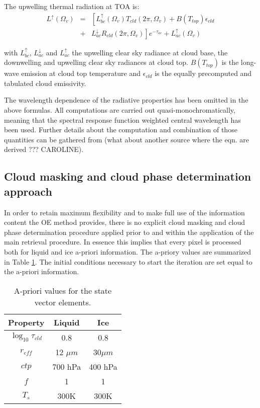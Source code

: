 \documentclass[amt]{style/copernicus}
\begin{document}
The upwelling thermal radiation at TOA is:
\begin{eqnarray}
L^\uparrow(\Omega_v) &=&\left [L^\uparrow_{bc}(\Omega_v)T_{cld}(2\pi,\Omega_v)+B(T_{top})\epsilon_{cld}\right .\\\nonumber
                                      &+& \left . L^\downarrow_{ac}R_{cld}(2\pi,\Omega_v)\right ] e^{-\tau_{ac}}+L_{ac}^\uparrow(\Omega_v)
\end{eqnarray}

with $L^\uparrow_{bc}$, $L^\downarrow_{ac}$ and $ L_{ac}^\uparrow$ the upwelling clear sky radiance at cloud base, the downwelling and upwelling clear sky radiances at cloud top. $B(T_{top})$ is the long-wave emission at cloud top temperature and $\epsilon_{cld}$ is the equally precomputed and tabulated cloud emissivity.

The wavelength dependence of the radiative properties has been omitted in the above formulas. All computations are carried out quasi-monochromatically, meaning that the spectral response function weighted central wavelength has been used. Further details about the computation and combination of those quantities can be gathered from \citet{Poulsen12} (what about another source where the eqn. are derived ??? CAROLINE).

\subsection{Cloud masking and cloud phase determination approach}\label{maskandphase}


In order to retain maximum flexibility and to make full use of the information content  the OE method provides, there is no explicit cloud masking and cloud phase determination procedure applied prior to and within the application of the main retrieval procedure. In essence this implies that every pixel is processed both for liquid and ice a-priori information. The a-priory values are summarized in Table \ref{apriorytable}. The initial conditions necessary to start the iteration are set equal to the a-priori information.

\begin{table}
\caption{A-priori values for the state vector elements.}
\begin{tabular}{ccc}\label{apriorytable}
Property & Liquid  & Ice\\\hline
$\log_{10}\tau_{cld}$         &  0.8           &  0.8 \\      
$r_{eff}$ & 12 $\mu m$ & 30$\mu m$ \\
$ctp$ & 700 hPa & 400 hPa \\
$f$ & 1 & 1 \\
$T_s$ & 300K & 300K\\
\end{tabular}
\end{table}
\end{document}
